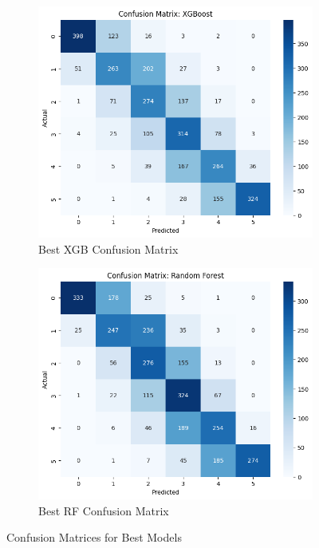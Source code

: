 \documentclass[12pt]{article}
\begin{document}
\begin{figure}[H]
\centering
\begin{subfigure}[b]{0.48\textwidth}
    \includegraphics[width=\textwidth]{images/xgb_matrix.png}
    \caption{Best XGB Confusion Matrix}
    \label{fig:xgb_matrix}
\end{subfigure}
\hfill
\begin{subfigure}[b]{0.48\textwidth}
    \includegraphics[width=\textwidth]{images/rf_matrix.png}
    \caption{Best RF Confusion Matrix}
    \label{fig:rf_matrix}
\end{subfigure}
\caption{Confusion Matrices for Best Models}
\label{fig:confusion_matrices}
\end{figure}
\end{document}
